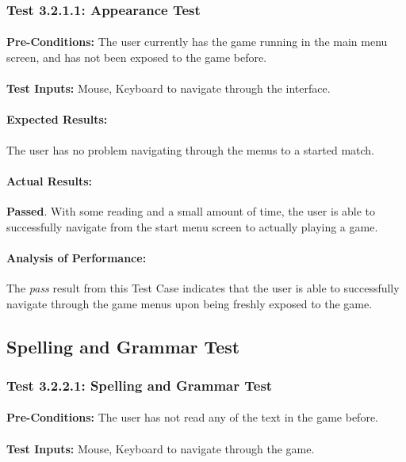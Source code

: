 \documentclass{article}
\begin{document}
\subsubsection{Test 3.2.1.1: Appearance Test }
    \paragraph{}\textbf{Pre-Conditions:} The user currently has the game running in the main menu screen, and has not been exposed to the game before.
    \paragraph{}\textbf{Test Inputs:} Mouse, Keyboard to navigate through the interface.
    \paragraph{Expected Results:} The user has no problem navigating through the menus to a started match.
    \paragraph{Actual Results:} \textbf{Passed}. With some reading and a small amount of time, the user is able to successfully navigate from the start menu screen to actually playing a game.
    \paragraph{Analysis of Performance:} The \emph{pass} result from this Test Case indicates that the user is able to successfully navigate through the game menus upon being freshly exposed to the game.
\subsection{Spelling and Grammar Test}
\subsubsection{Test 3.2.2.1: Spelling and Grammar Test }
    \paragraph{}\textbf{Pre-Conditions:} The user has not read any of the text in the game before.
    \paragraph{}\textbf{Test Inputs:} Mouse, Keyboard to navigate through the game.
\end{document}
